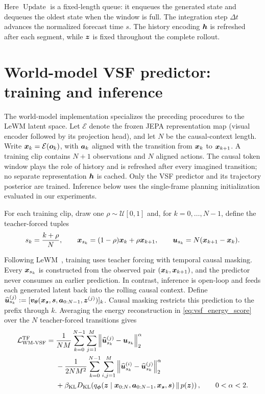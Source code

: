 \smallskip
\noindent
Here $\operatorname{Update}$ is a fixed-length queue: it enqueues the generated state and dequeues the oldest state
when the window is full. The integration step
$\Delta t$ advances the normalized forecast time $s$. The history encoding
${\bm{h}}$ is refreshed after each segment, while ${\bm{z}}$ is fixed throughout
the complete rollout.

\medskip
\noindent

\clearpage
\section{World-model VSF predictor:  training and inference}
\label{sec:wm-vsf-algorithms}

The world-model implementation specializes the preceding procedures to the
LeWM latent space. Let $\mathcal E$ denote the frozen JEPA representation map
(visual encoder followed by its projection head), and let $N$ be the
causal-context length. Write ${\bm{x}}_k=\mathcal E({\bm{o}}_k)$, with ${\bm{a}}_k$ aligned
with the transition from ${\bm{x}}_k$ to ${\bm{x}}_{k+1}$. A training clip
contains $N+1$ observations and $N$ aligned actions. The causal token window
plays the role of history and is refreshed after every imagined transition;
no separate representation ${\bm{h}}$ is cached. Only the VSF predictor and its
trajectory posterior are trained. Inference below uses the single-frame
planning initialization evaluated in our experiments.

For each training clip, draw one $\rho\sim\mathcal U[0,1]$ and, for
$k=0,\ldots,N-1$, define the teacher-forced tuples
\[
  s_k=\frac{k+\rho}{N},\qquad
  {\bm{x}}_{s_k}=(1-\rho){\bm{x}}_k+\rho{\bm{x}}_{k+1},\qquad
  {\bm{u}}_{s_k}=N({\bm{x}}_{k+1}-{\bm{x}}_k).
\]

Following LeWM~\citep{maes2026leworldmodel}, training uses teacher forcing with
temporal causal masking. Every ${\bm{x}}_{s_k}$ is constructed from the observed pair
$({\bm{x}}_k,{\bm{x}}_{k+1})$, and the predictor never consumes an earlier prediction. In
contrast, inference is open-loop and feeds each generated latent back into the
rolling causal context. Define
$\widehat{{\bm{u}}}_{s_k}^{(j)}:=[{\bm{v}}_{{\bm{\theta}}}({\bm{x}}_{{\bm{s}}},{\bm{s}},
{\bm{a}}_{0:N-1},{\bm{z}}^{(j)})]_k$. Causal masking restricts this prediction to the
prefix through $k$. Averaging the energy reconstruction in
\eqref{eq:vsf_energy_score} over the $N$ teacher-forced transitions gives
\begin{equation}
\begin{aligned}
\mathcal L_{\mathrm{WM\text{-}VSF}}^{\mathrm{TF}}
={}&\frac{1}{NM}\sum_{k=0}^{N-1}\sum_{j=1}^{M}
\left\|\widehat{{\bm{u}}}_{s_k}^{(j)}-{\bm{u}}_{s_k}\right\|_2^\alpha \\
&-\frac{1}{2NM^2}\sum_{k=0}^{N-1}\sum_{i,j=1}^{M}
\left\|\widehat{{\bm{u}}}_{s_k}^{(i)}-
\widehat{{\bm{u}}}_{s_k}^{(j)}\right\|_2^\alpha \\
&+\beta_{\mathrm{KL}}D_{\mathrm{KL}}\!\left(
q_{\boldsymbol{\phi}}({\bm{z}}\mid{\bm{x}}_{0:N},{\bm{a}}_{0:N-1},{\bm{x}}_{{\bm{s}}},{\bm{s}})
\,\Vert\,p({\bm{z}})\right),
\qquad 0<\alpha<2.
\end{aligned}
\label{eq:wm-vsf-teacher-forcing-loss}
\end{equation}


